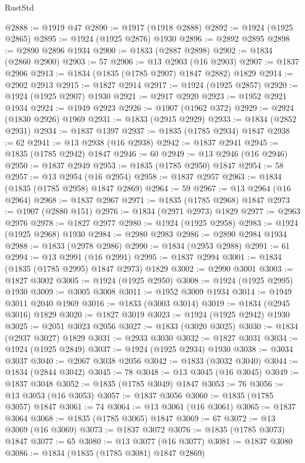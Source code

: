 \begin{lexlean}{RustStd}
\begin{coremodule}
{\begin{coremodule}
{{{{{@2888 := @1919 @47
@2890 := @1917 (@1918 @2888)
@2892 := @1924 (@1925 @2865)
@2895 := @1924 (@1925 @2876) @1930
@2896 := @2892 @2895
@2898 := @2890 @2896 @1934
@2900 := @1833 (@2887 @2898)
@2902 := @1834 (@2860 @2900)
@2903 := 57
@2906 := @13 @2903 (@16 @2903)
@2907 := @1837 @2906
@2913 := @1834 (@1835 (@1785 @2907) @1847 @2882) @1829
@2914 := @2902 @2913
@2915 := @1827 @2914
@2917 := @1924 (@1925 @2857)
@2920 := @1924 (@1925 @2907) @1930
@2921 := @2917 @2920
@2923 := @1952 @2921 @1934
@2924 := @1949 @2923
@2926 := @1907 (@1962 @372)
@2929 := @2924 (@1830 @2926) @1969
@2931 := @1833 (@2915 @2929)
@2933 := @1834 (@2852 @2931)
@2934 := @1837 @1397
@2937 := @1835 (@1785 @2934) @1847
@2938 := 62
@2941 := @13 @2938 (@16 @2938)
@2942 := @1837 @2941
@2945 := @1835 (@1785 @2942) @1847
@2946 := 60
@2949 := @13 @2946 (@16 @2946)
@2950 := @1837 @2949
@2953 := @1835 (@1785 @2950) @1847
@2954 := 58
@2957 := @13 @2954 (@16 @2954)
@2958 := @1837 @2957
@2963 := @1834 (@1835 (@1785 @2958) @1847 @2869)
@2964 := 59
@2967 := @13 @2964 (@16 @2964)
@2968 := @1837 @2967
@2971 := @1835 (@1785 @2968) @1847
@2973 := @1907 (@2880 @151)
@2976 := @1834 (@2971 @2973) @1829
@2977 := @2963 @2976
@2978 := @1827 @2977
@2980 := @1924 (@1925 @2958)
@2983 := @1924 (@1925 @2968) @1930
@2984 := @2980 @2983
@2986 := @2890 @2984 @1934
@2988 := @1833 (@2978 @2986)
@2990 := @1834 (@2953 @2988)
@2991 := 61
@2994 := @13 @2991 (@16 @2991)
@2995 := @1837 @2994
@3001 := @1834 (@1835 (@1785 @2995) @1847 @2973) @1829
@3002 := @2990 @3001
@3003 := @1827 @3002
@3005 := @1924 (@1925 @2950)
@3008 := @1924 (@1925 @2995) @1930
@3009 := @3005 @3008
@3011 := @1952 @3009 @1934
@3014 := @1949 @3011 @2040 @1969
@3016 := @1833 (@3003 @3014)
@3019 := @1834 (@2945 @3016) @1829
@3020 := @1827 @3019
@3023 := @1924 (@1925 @2942) @1930
@3025 := @2051 @3023 @2056
@3027 := @1833 (@3020 @3025)
@3030 := @1834 (@2937 @3027) @1829
@3031 := @2933 @3030
@3032 := @1827 @3031
@3034 := @1924 (@1925 @2849)
@3037 := @1924 (@1925 @2934) @1930
@3038 := @3034 @3037
@3040 := @2067 @3038 @2056
@3042 := @1833 (@3032 @3040)
@3044 := @1834 (@2844 @3042)
@3045 := 78
@3048 := @13 @3045 (@16 @3045)
@3049 := @1837 @3048
@3052 := @1835 (@1785 @3049) @1847
@3053 := 76
@3056 := @13 @3053 (@16 @3053)
@3057 := @1837 @3056
@3060 := @1835 (@1785 @3057) @1847
@3061 := 74
@3064 := @13 @3061 (@16 @3061)
@3065 := @1837 @3064
@3068 := @1835 (@1785 @3065) @1847
@3069 := 67
@3072 := @13 @3069 (@16 @3069)
@3073 := @1837 @3072
@3076 := @1835 (@1785 @3073) @1847
@3077 := 65
@3080 := @13 @3077 (@16 @3077)
@3081 := @1837 @3080
@3086 := @1834 (@1835 (@1785 @3081) @1847 @2869)
}}}}}
\end{coremodule}}
\end{coremodule}
\end{lexlean}
